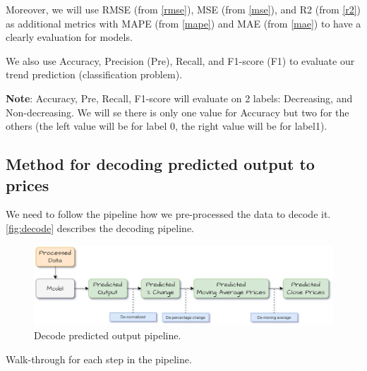 Moreover, we will use RMSE (from \autoref{rmse}), MSE (from \autoref{mse}), and R2
(from \autoref{r2}) as additional metrics with MAPE (from \autoref{mape}) and MAE
(from \autoref{mae}) to have a clearly evaluation for models.

We also use Accuracy, Precision (Pre), Recall, and F1-score (F1) to evaluate our
trend prediction (classification problem).

\textbf{Note}: Accuracy, Pre, Recall, F1-score will evaluate on 2 labels:
Decreasing, and Non-decreasing. We will se there is only one value for Accuracy
but two for the others (the left value will be for label 0, the right value will
be for label1).

\subsection{Method for decoding predicted output to prices}
We need to follow the pipeline how we pre-processed the data to decode it.
\autoref{fig:decode} describes the decoding pipeline.
\begin{figure}[H]
	\centering
	\includegraphics[width=1\linewidth]{images/decode.eps}
	\caption{Decode predicted output pipeline.}
	\label{fig:decode}
\end{figure}
Walk-through for each step in the pipeline.


